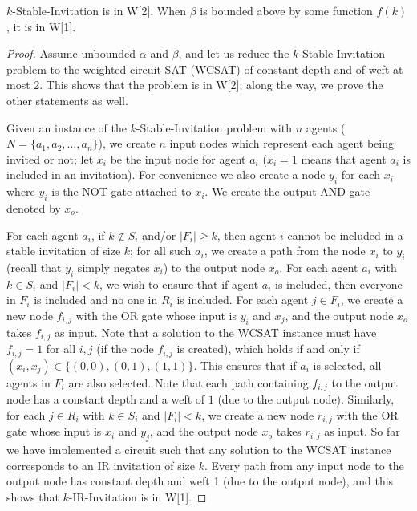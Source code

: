 \begin{theorem} \label{SIP:thm:stable_W2}
	$k$-Stable-Invitation is in W[2]. When $\beta$ is bounded above by some function $f(k)$, it is in W[1].
\end{theorem}
\begin{proof}
	Assume unbounded $\alpha$ and $\beta$, and let us reduce the $k$-Stable-Invitation problem to the weighted circuit SAT (WCSAT) of constant depth and of weft at most 2. This shows that the problem is in W[2]; along the way, we prove the other statements as well.

	Given an instance of the $k$-Stable-Invitation problem with $n$ agents ($N = \{a_1, a_2, \dots, a_n\}$), we create $n$ input nodes which represent each agent being invited or not; let $x_i$ be the input node for agent $a_i$ ($x_i = 1$ means that agent $a_i$ is included in an invitation). For convenience we also create a node $y_i$ for each $x_i$ where $y_i$ is the NOT gate attached to $x_i$. We create the output AND gate denoted by $x_o$. 
	
	For each agent $a_i$, if $k\not\in S_i$ and/or $|F_i| \geq k$, then agent $i$ cannot be included in a stable invitation of size $k$; for all such $a_i$, we create a path from the node $x_i$ to $y_i$ (recall that $y_i$ simply negates $x_i$) to the output node $x_o$.
	For each agent $a_i$ with $k \in S_i$ and $|F_i| < k$, we wish to ensure that if agent $a_i$ is included, then everyone in $F_i$ is included and no one in $R_i$ is included. For each agent $j\in F_i$, we create a new node $f_{i,j}$ with the OR gate whose input is $y_i$ and $x_j$, and the output node $x_o$ takes $f_{i,j}$ as input. Note that a solution to the WCSAT instance must have $f_{i,j} = 1$ for all $i,j$ (if the node $f_{i,j}$ is created), which holds if and only if $(x_i, x_j) \in \{(0,0), (0,1), (1,1)\}$. This ensures that if $a_i$ is selected, all agents in $F_i$ are also selected. Note that each path containing $f_{i,j}$ to the output node has a constant depth and a weft of $1$ (due to the output node). Similarly, for each $j\in R_i$ with $k\in S_i$ and $|F_i| < k$, we create a new node $r_{i,j}$ with the OR gate whose input is $x_i$ and $y_j$, and the output node $x_o$ takes $r_{i,j}$ as input. 
	So far we have implemented a circuit such that any solution to the WCSAT instance corresponds to an IR invitation of size $k$. Every path from any input node to the output node has constant depth and weft 1 (due to the output node), and this shows that $k$-IR-Invitation is in W[1]. 
	

\end{proof}
